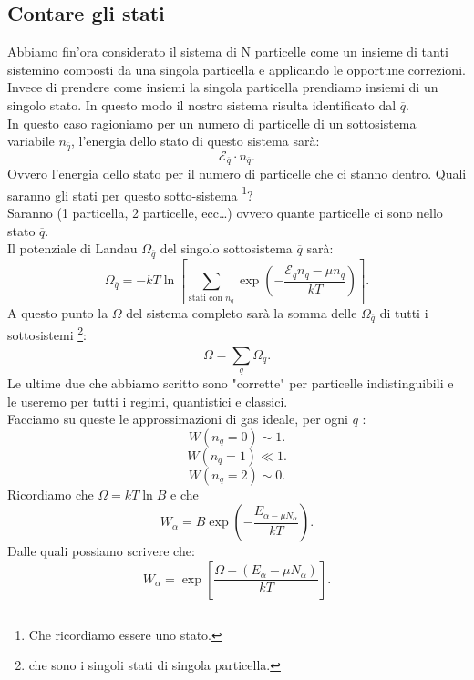 \subsection{Contare gli stati}%
\label{subsub:Conteggio degli stati}
Abbiamo fin'ora considerato il sistema di N particelle come un insieme di tanti sistemino composti da una singola particella e applicando le opportune correzioni. Invece di prendere come insiemi la singola particella prendiamo insiemi di un singolo stato. In questo modo il nostro sistema risulta identificato dal $\overline{q}$.\\
In questo caso ragioniamo per un numero di particelle di un sottosistema variabile $n_{\overline{q}}$, l'energia dello stato di questo sistema sarà:
\[
	 \mathcal{E}_{\overline{q}}\cdot n_{\overline{q}}
.\] 
Ovvero l'energia dello stato per il numero di particelle che ci stanno dentro. Quali saranno gli stati per questo sotto-sistema \footnote{Che ricordiamo essere uno stato.}?\\
Saranno (1 particella, 2 particelle, ecc\ldots) ovvero quante particelle ci sono nello stato  $\overline{q}$.\\
Il potenziale di Landau $\Omega_{\overline{q}}$ del singolo sottosistema $\overline{q}$ sarà:
\[
	\Omega_{\overline{q}} = - kT 
	\ln \left[ \sum_{\text{stati con $n_{q}$}}^{} \exp\left( -\frac{\mathcal{E}_{q}n_{q}-\mu n_{q}}{kT} \right) 
\right] .\] \label{eq:Landau_gas_ideale}
A questo punto la $\Omega$ del sistema completo sarà la somma delle $\Omega_{\overline{q}}$ di tutti i sottosistemi \footnote{che sono i singoli stati di singola particella.}:
\[
	\Omega = \sum_{q}^{} \Omega_{q}
.\] 
Le ultime due che abbiamo scritto sono "corrette" per particelle indistinguibili e le useremo per tutti i regimi, quantistici e classici.\\ 
Facciamo su queste le approssimazioni di gas ideale, per ogni $q$ :
\[
	W\left( n_{q}=0 \right) \sim 1 
.\] 
\[
	W\left( n_{q}=1 \right) \ll 1
.\] 
\[
	W\left( n_{q}=2 \right) \sim 0
.\] 
Ricordiamo che $\Omega = kT \ln B$ e che
\[
	W_{\alpha}= B \exp\left( -\frac{E_{\alpha-\mu N_{\alpha}}}{kT} \right) 
.\] 
Dalle quali possiamo scrivere che:
\[
	W_{\alpha} = \exp\left[ \frac{\Omega-\left( E_{\alpha}-\mu N_{\alpha} \right) }{kT} \right] 
.\] 

